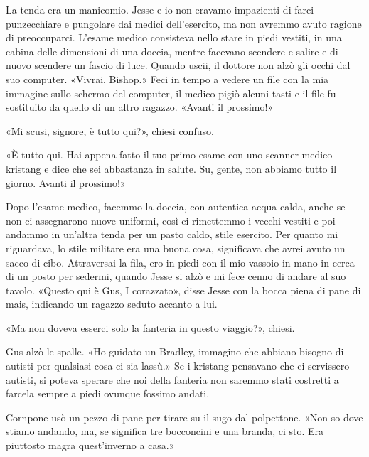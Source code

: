 La tenda era un manicomio. Jesse e io non eravamo impazienti di farci
punzecchiare e pungolare dai medici dell'esercito, ma non avremmo avuto
ragione di preoccuparci. L'esame medico consisteva nello stare in piedi
vestiti, in una cabina delle dimensioni di una doccia, mentre facevano
scendere e salire e di nuovo scendere un fascio di luce. Quando uscii,
il dottore non alzò gli occhi dal suo computer. «Vivrai, Bishop.» Feci
in tempo a vedere un file con la mia immagine sullo schermo del
computer, il medico pigiò alcuni tasti e il file fu sostituito da quello
di un altro ragazzo. «Avanti il prossimo!»

«Mi scusi, signore, è tutto qui?», chiesi confuso.

«È tutto qui. Hai appena fatto il tuo primo esame con uno scanner medico
kristang e dice che sei abbastanza in salute. Su, gente, non abbiamo
tutto il giorno. Avanti il prossimo!»

Dopo l'esame medico, facemmo la doccia, con autentica acqua calda, anche
se non ci assegnarono nuove uniformi, così ci rimettemmo i vecchi
vestiti e poi andammo in un'altra tenda per un pasto caldo, stile
esercito. Per quanto mi riguardava, lo stile militare era una buona
cosa, significava che avrei avuto un sacco di cibo. Attraversai la fila,
ero in piedi con il mio vassoio in mano in cerca di un posto per
sedermi, quando Jesse si alzò e mi fece cenno di andare al suo tavolo.
«Questo qui è Gus, I corazzato», disse Jesse con la bocca piena di pane
di mais, indicando un ragazzo seduto accanto a lui.

«Ma non doveva esserci solo la fanteria in questo viaggio?», chiesi.

Gus alzò le spalle. «Ho guidato un Bradley, immagino che abbiano bisogno
di autisti per qualsiasi cosa ci sia lassù.» Se i kristang pensavano che
ci servissero autisti, si poteva sperare che noi della fanteria non
saremmo stati costretti a farcela sempre a piedi ovunque fossimo andati.

Cornpone usò un pezzo di pane per tirare su il sugo dal polpettone. «Non
so dove stiamo andando, ma, se significa tre bocconcini e una branda, ci
sto. Era piuttosto magra quest'inverno a casa.»

\hfill\break

